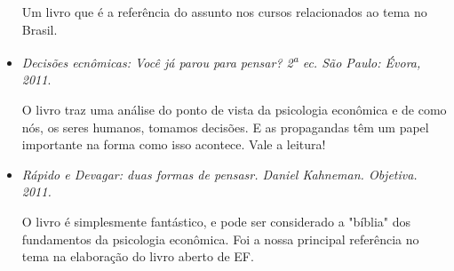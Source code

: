 \begin{paginatexto}
\begin{itemize}
    Um livro que é a referência do assunto nos cursos relacionados ao tema no Brasil.
    \item \textit{Decisões ecnômicas: Você já parou para pensar? 2\textsuperscript{a} ec. São Paulo: Évora, 2011}.

    O livro traz uma análise do ponto de vista da psicologia econômica e de como nós, os seres humanos, tomamos decisões. E as propagandas têm um papel importante na forma como isso acontece. Vale a leitura!
    \item \textit{Rápido e Devagar: duas formas de pensasr. Daniel Kahneman. Objetiva. 2011.}

    O livro é simplesmente fantástico, e pode ser considerado a "bíblia"{} dos fundamentos da psicologia econômica. Foi a nossa principal referência no tema na elaboração do livro aberto de EF.
\end{itemize}

\end{paginatexto}

